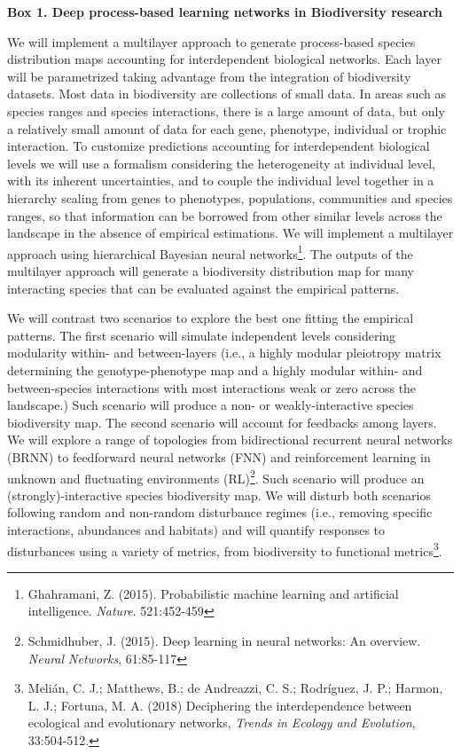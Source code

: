\documentclass[authoryear,1p,12pt]{elsarticle}
\begin{document}
\begin{mybox}\begin{singlespace}
{\bf{Box 1. Deep process-based learning networks in Biodiversity research}}\\
\begin{small}
  We will implement a multilayer approach to generate process-based
  species distribution maps accounting for interdependent biological
  networks. Each layer will be parametrized taking advantage from the
  integration of biodiversity datasets. Most data in biodiversity are
  collections of small data. In areas such as species ranges and
  species interactions, there is a large amount of data, but only a
  relatively small amount of data for each gene, phenotype, individual
  or trophic interaction. To customize predictions accounting for
  interdependent biological levels we will use a formalism considering
  the heterogeneity at individual level, with its inherent
  uncertainties, and to couple the individual level together in a
  hierarchy scaling from genes to phenotypes, populations, communities
  and species ranges, so that information can be borrowed from other
  similar levels across the landscape in the absence of empirical
  estimations. We will implement a multilayer approach using
  hierarchical Bayesian neural networks\footnote{Ghahramani,
    Z. (2015). Probabilistic machine learning and artificial
    intelligence. {\em Nature}. 521:452-459}. The outputs of the
  multilayer approach will generate a biodiversity distribution map
  for many interacting species that can be evaluated against the
  empirical patterns.

  We will contrast two scenarios to explore the best one fitting the
  empirical patterns. The first scenario will simulate independent
  levels considering modularity within- and between-layers (i.e., a
  highly modular pleiotropy matrix determining the genotype-phenotype
  map and a highly modular within- and between-species interactions
  with most interactions weak or zero across the landscape.) Such
  scenario will produce a non- or weakly-interactive species
  biodiversity map. The second scenario will account for feedbacks
  among layers. We will explore a range of topologies from
  bidirectional recurrent neural networks (BRNN) to feedforward neural
  networks (FNN) and reinforcement learning in unknown and fluctuating
  environments (RL)\footnote{Schmidhuber, J. (2015). Deep learning in
    neural networks: An overview. {\em Neural Networks},
    61:85-117}. Such scenario will produce an (strongly)-interactive
  species biodiversity map. We will disturb both scenarios following
  random and non-random disturbance regimes (i.e., removing specific
  interactions, abundances and habitats) and will quantify responses
  to disturbances using a variety of metrics, from biodiversity to
  functional metrics\footnote{Melián, C. J.; Matthews, B.; de
    Andreazzi, C. S.; Rodríguez, J. P.; Harmon, L. J.; Fortuna,
    M. A. (2018) Deciphering the interdependence between ecological
    and evolutionary networks, {\em Trends in Ecology and Evolution},
    33:504-512.}.
\end{small}
\end{singlespace}
\end{mybox}
\end{document}
